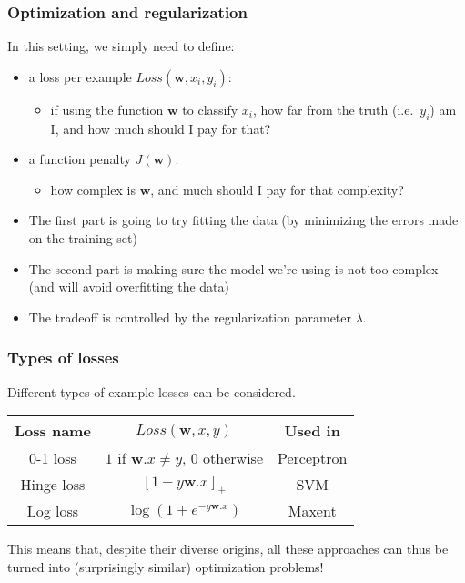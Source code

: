 \documentclass[usenames,dvipsnames]{beamer}
\newcommand{\w}{\mathbf{w}}
\begin{document}
\begin{frame}\frametitle{Optimization and regularization}

In this setting, we simply need to define:
\begin{itemize}
\item a loss per example $Loss(\w, x_i, y_i)$:
\begin{itemize}
\item if using the function $\w$ to classify $x_i$, how far from the truth (i.e.\ $y_i$) am I, and
  how much should I pay for that?
\end{itemize}
\item a function penalty $J(\w)$:
\begin{itemize}
\item how complex is $\w$, and much should I pay for that complexity?
\end{itemize}
\end{itemize}

\vspace{0.4cm}
\begin{itemize}
\item The first part is going to try fitting the data (by minimizing the
errors made on the training set)
\item The second part is making sure the model we're using is not too
  complex (and will avoid overfitting the data)
\item The tradeoff is controlled by the regularization parameter
  $\lambda$.
\end{itemize}

\end{frame}


\begin{frame}\frametitle{Types of losses}

Different types of example losses can be considered.

\begin{center}
\begin{tabular}{|c|c|c|}
\hline
Loss name & $Loss(\w, x, y)$ & Used in \\
\hline
0-1 loss & $1$ if $\w.x \neq y$, $0$ otherwise &Perceptron \\
Hinge loss & $\left[ 1-y \w.x \right]_+$ & SVM \\
Log loss & $\log(1+e^{-y \w.x})$ & Maxent \\
\hline
\end{tabular}
\end{center}

\vspace{0.4cm}
This means that, despite their diverse origins, all these approaches can thus be turned into (surprisingly similar) optimization problems!

\end{frame}
\end{document}
